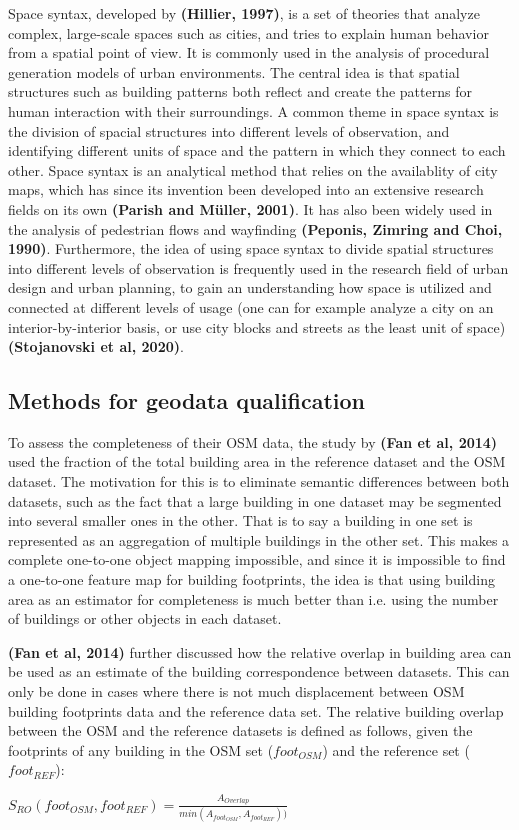 \documentclass{kththesis}
\begin{document}
Space syntax, developed by \textbf{(Hillier, 1997)}, is a set of theories that analyze complex, large-scale spaces such as cities, and tries to explain human behavior from a spatial point of view.
It is commonly used in the analysis of procedural generation models of urban environments.
The central idea is that spatial structures such as building patterns both reflect and create the patterns for human interaction with their surroundings.
A common theme in space syntax is the division of spacial structures into different levels of observation, and identifying different units of space and the pattern in which they connect to each other.
Space syntax is an analytical method that relies on the availablity of city maps, which has since its invention been developed into an extensive research fields on its own
\textbf{(Parish and Müller, 2001)}.
It has also been widely used in the analysis of pedestrian flows and wayfinding
\textbf{(Peponis, Zimring and Choi, 1990)}.
Furthermore, the idea of using space syntax to divide spatial structures into different levels of observation is frequently used in the research field of urban design and urban planning, to gain an understanding how space is utilized and connected at different levels of usage (one can for example analyze a city on an interior-by-interior basis, or use city blocks and streets as the least unit of space)
\textbf{(Stojanovski et al, 2020)}.

\subsection{Methods for geodata qualification}

To assess the completeness of their OSM data, the study by \textbf{(Fan et al, 2014)} used the fraction of the total building area in the reference dataset and the OSM dataset.
The motivation for this is to eliminate semantic differences between both datasets, such as the fact that a large building in one dataset may be segmented into several smaller ones in the other.
That is to say a building in one set is represented as an aggregation of multiple buildings in the other set.
This makes a complete one-to-one object mapping impossible, and since it is impossible to find a one-to-one feature map for building footprints, the idea is that using building area as an estimator for completeness is much better than i.e. using the number of buildings or other objects in each dataset.

\textbf{(Fan et al, 2014)} further discussed how the relative overlap in building area can be used as an estimate of the building correspondence between datasets.
This can only be done in cases where there is not much displacement between OSM building footprints data and the reference data set.
The relative building overlap between the OSM and the reference datasets is defined as follows, given the footprints of any building in the OSM set ($foot_{OSM}$) and the reference set ($foot_{REF}$):
\begin{center}
    $S_{RO}(foot_{OSM}, foot_{REF}) = \frac{A_{Overlap}}{min(A_{foot_{OSM}}, A_{foot_{REF}}))}$
\end{center}
\end{document}
